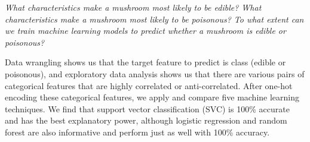 \documentclass[11pt]{article}
\begin{document}
\begin{flushleft}
{\em What characteristics make a mushroom most likely to be edible?
What characteristics make a mushroom most likely to be poisonous?
To what extent can we train machine learning models to predict whether a
mushroom is edible or poisonous?}
\end{flushleft}

Data wrangling shows us that the target feature to predict is class
(edible or poisonous), and exploratory data analysis shows us that there
are various pairs of categorical features that are highly correlated
or anti-correlated. After one-hot encoding these categorical features, we
apply and compare five machine learning techniques.
We find that support vector classification (SVC) is 100\% accurate and has the
best explanatory power, although logistic regression and random forest are also
informative and perform just as well with 100\% accuracy.
\end{document}
